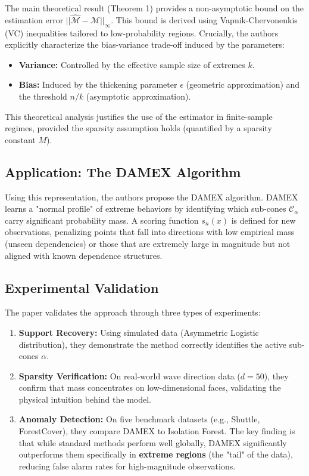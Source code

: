 \documentclass[11pt]{article}
\begin{document}
The main theoretical result (Theorem 1) provides a non-asymptotic bound on the estimation error $||\widehat{\mathcal{M}} - \mathcal{M}||_\infty$. This bound is derived using Vapnik-Chervonenkis (VC) inequalities tailored to low-probability regions. Crucially, the authors explicitly characterize the bias-variance trade-off induced by the parameters:
\begin{itemize}
    \item \textbf{Variance:} Controlled by the effective sample size of extremes $k$.
    \item \textbf{Bias:} Induced by the thickening parameter $\epsilon$ (geometric approximation) and the threshold $n/k$ (asymptotic approximation).
\end{itemize}
This theoretical analysis justifies the use of the estimator in finite-sample regimes, provided the sparsity assumption holds (quantified by a sparsity constant $M$).

\subsection{Application: The DAMEX Algorithm}
Using this representation, the authors propose the DAMEX algorithm. DAMEX learns a "normal profile" of extreme behaviors by identifying which sub-cones $\mathcal{C}_\alpha$ carry significant probability mass. A scoring function $s_n(x)$ is defined for new observations, penalizing points that fall into directions with low empirical mass (unseen dependencies) or those that are extremely large in magnitude but not aligned with known dependence structures.

\subsection{Experimental Validation}
The paper validates the approach through three types of experiments:
\begin{enumerate}
    \item \textbf{Support Recovery:} Using simulated data (Asymmetric Logistic distribution), they demonstrate the method correctly identifies the active sub-cones $\alpha$.
    \item \textbf{Sparsity Verification:} On real-world wave direction data ($d=50$), they confirm that mass concentrates on low-dimensional faces, validating the physical intuition behind the model.
    \item \textbf{Anomaly Detection:} On five benchmark datasets (e.g., Shuttle, ForestCover), they compare DAMEX to Isolation Forest. The key finding is that while standard methods perform well globally, DAMEX significantly outperforms them specifically in \textbf{extreme regions} (the "tail" of the data), reducing false alarm rates for high-magnitude observations.
\end{enumerate}
\end{document}
